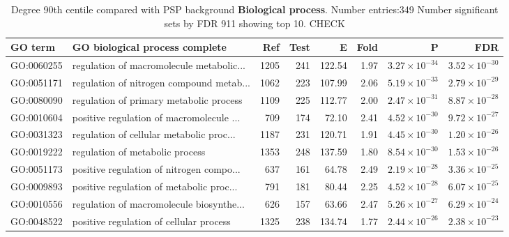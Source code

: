 \begin{table}[ht]
\centering
\begin{adjustbox}{width=\textwidth}

\begin{tabular}{llrrrrrr}
  \hline
GO term & GO \textbf{biological process} complete & Ref & Test & E & Fold & P & FDR \\ 
  \hline
GO:0060255 & regulation of macromolecule metabolic... & 1205 & 241 & 122.54 & 1.97 & $3.27 \times 10^{-34}$ & $3.52 \times 10^{-30}$ \\ 
  GO:0051171 & regulation of nitrogen compound metab... & 1062 & 223 & 107.99 & 2.06 & $5.19 \times 10^{-33}$ & $2.79 \times 10^{-29}$ \\ 
  GO:0080090 & regulation of primary metabolic process  & 1109 & 225 & 112.77 & 2.00 & $2.47 \times 10^{-31}$ & $8.87 \times 10^{-28}$ \\ 
  GO:0010604 & positive regulation of macromolecule ... & 709 & 174 & 72.10 & 2.41 & $4.52 \times 10^{-30}$ & $9.72 \times 10^{-27}$ \\ 
  GO:0031323 & regulation of cellular metabolic proc... & 1187 & 231 & 120.71 & 1.91 & $4.45 \times 10^{-30}$ & $1.20 \times 10^{-26}$ \\ 
  GO:0019222 & regulation of metabolic process  & 1353 & 248 & 137.59 & 1.80 & $8.54 \times 10^{-30}$ & $1.53 \times 10^{-26}$ \\ 
  GO:0051173 & positive regulation of nitrogen compo... & 637 & 161 & 64.78 & 2.49 & $2.19 \times 10^{-28}$ & $3.36 \times 10^{-25}$ \\ 
  GO:0009893 & positive regulation of metabolic proc... & 791 & 181 & 80.44 & 2.25 & $4.52 \times 10^{-28}$ & $6.07 \times 10^{-25}$ \\ 
  GO:0010556 & regulation of macromolecule biosynthe... & 626 & 157 & 63.66 & 2.47 & $5.26 \times 10^{-27}$ & $6.29 \times 10^{-24}$ \\ 
  GO:0048522 & positive regulation of cellular process  & 1325 & 238 & 134.74 & 1.77 & $2.44 \times 10^{-26}$ & $2.38 \times 10^{-23}$ \\ 
  \hline
\end{tabular}

\end{adjustbox}
\caption{Degree 90th centile  compared with PSP background \textbf{Biological process}. Number entries:349 Number significant sets by FDR 911 showing top 10. CHECK} 
\label{tab:deg 90 cw psp bp.txt Number entries:349 Number significant sets by FDR 911 showing top 10}
\end{table}


